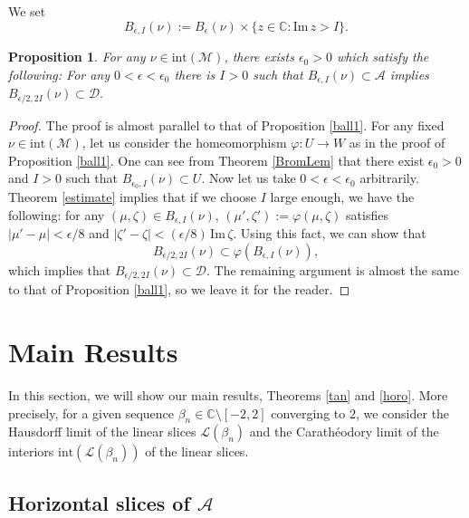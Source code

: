\documentclass[12pt]{article}
\theoremstyle{plain}
\newtheorem{prop}[thm]{Proposition}
\theoremstyle{definition}
\theoremstyle{remark}
\newcommand{\C}{\mathbb C}
\newcommand{\D}{\mathcal D}
\newcommand{\M}{\mathcal M}
\newcommand{\LL}{\mathcal L}
\newcommand{\A}{\mathcal A}
\newcommand{\ep}{\epsilon}
\newcommand{\sm}{\setminus}
\newcommand{\ze}{\zeta}
\newcommand{\inte}{\mathrm{int}}
\newcommand{\im}{\mathrm{Im}}
\begin{document}
We set 
$$
B_{\ep,I}(\nu):=B_\ep(\nu) \times \{ z \in \C: \im \,z>I\}. 
$$

\begin{prop}\label{ball2}
For any $\nu \in \inte(\M)$, there exists $\ep_0>0$ which satisfy the following: 
For any $0<\ep<\ep_0$ there is $I>0$ such that 
$
B_{\ep,I}(\nu) \subset \A
$
implies 
$
 B_{\ep/2,2I}(\nu)  \subset \D. 
$
\end{prop}

\begin{proof}
The proof is almost parallel to that of Proposition \ref{ball1}. 
For any fixed $\nu \in \inte(\M)$, 
let us consider the homeomorphism $\varphi:U \to W$ as in the proof of Proposition \ref{ball1}. 
One can see from Theorem \ref{BromLem} that 
there exist $\ep_0>0$ and $I>0$ such that $B_{\ep_0,I}(\nu) \subset U$. 
Now let us take $0<\ep<\ep_0$ arbitrarily. 
Theorem \ref{estimate} implies that if we choose $I$ large enough, 
we have the following: 
for any $(\mu,\ze) \in B_{\ep,I}(\nu)$,  $(\mu',\ze'):=\varphi(\mu,\ze)$ satisfies 
$|\mu'-\mu|<\ep/8$ and $|\ze'-\ze|< (\ep/8) \,\im\,\ze$. 
Using this fact, we can show  that 
$$
B_{\ep/2,2I}(\nu) \subset \varphi(B_{\ep,I}(\nu)),  
$$
which implies that $B_{\ep/2,2I}(\nu) \subset \D$. 
The remaining  argument is almost the same to that of Proposition \ref{ball1}, so we leave it for the reader. 
\end{proof}


\section{Main Results}


In this section, we will show our main results, Theorems \ref{tan} and \ref{horo}. 
More precisely, 
for a given sequence $\beta_n \in \C \sm [-2,2]$ converging to $2$, 
we consider the Hausdorff limit of the linear slices $\LL(\beta_n)$ and the 
Carath\'{e}odory limit of the interiors $\inte(\LL(\beta_n))$ of the linear slices. 

\subsection{Horizontal slices of $\A$}
\end{document}

